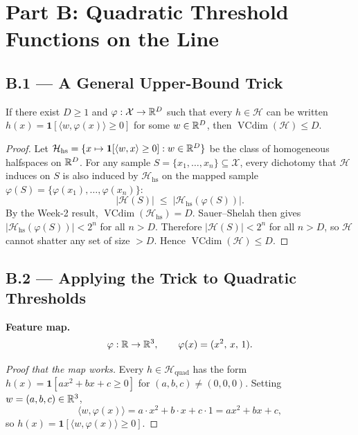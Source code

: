 \documentclass{article}
\begin{document}
\section{Part B: Quadratic Threshold Functions on the Line}
 
\subsection{B.1 --- A General Upper-Bound Trick}
 
\begin{theorem}
\label{thm:upper-bound-trick}
If there exist $D\ge1$ and $\varphi:\mathcal{X}\to\mathbb{R}^D$ such that every
$h\in\mathcal{H}$ can be written $h(x)=\mathbf{1}[\langle w,\varphi(x)\rangle\ge0]$
for some $w\in\mathbb{R}^D$, then $\operatorname{VCdim}(\mathcal{H})\le D$.
\end{theorem}
 
\begin{proof}
Let $\mathcal{H}_{\mathrm{hs}}=\{x\mapsto\mathbf{1}[\langle w,x\rangle\ge0]:w\in\mathbb{R}^D\}$
be the class of homogeneous halfspaces on $\mathbb{R}^D$.
For any sample $S=\{x_1,\dots,x_n\}\subseteq\mathcal{X}$, every dichotomy
that $\mathcal{H}$ induces on $S$ is also induced by $\mathcal{H}_{\mathrm{hs}}$
on the mapped sample $\varphi(S)=\{\varphi(x_1),\dots,\varphi(x_n)\}$:
\[
  |\mathcal{H}(S)| \;\le\; |\mathcal{H}_{\mathrm{hs}}(\varphi(S))|.
\]
By the Week-2 result, $\operatorname{VCdim}(\mathcal{H}_{\mathrm{hs}})=D$.
Sauer--Shelah then gives $|\mathcal{H}_{\mathrm{hs}}(\varphi(S))|<2^n$ for
all $n>D$.
Therefore $|\mathcal{H}(S)|<2^n$ for all $n>D$, so $\mathcal{H}$ cannot
shatter any set of size $>D$.
Hence $\operatorname{VCdim}(\mathcal{H})\le D$.
\end{proof}
 
\subsection{B.2 --- Applying the Trick to Quadratic Thresholds}
 
\begin{summarybox}
\textbf{Feature map.}
\[
  \varphi:\mathbb{R}\to\mathbb{R}^3,
  \qquad
  \varphi(x)=(x^2,\,x,\,1).
\]
\end{summarybox}
 
\begin{proof}[Proof that the map works]
Every $h\in\mathcal{H}_{\mathrm{quad}}$ has the form $h(x)=\mathbf{1}[ax^2+bx+c\ge0]$
for $(a,b,c)\ne(0,0,0)$.  Setting $w=(a,b,c)\in\mathbb{R}^3$,
\[
  \langle w,\varphi(x)\rangle
  =a\cdot x^2+b\cdot x+c\cdot 1
  =ax^2+bx+c,
\]
so $h(x)=\mathbf{1}[\langle w,\varphi(x)\rangle\ge0]$.
\end{proof}
 
\end{document}
